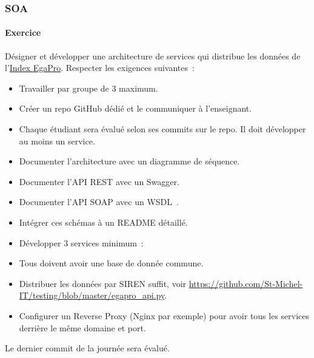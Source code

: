\documentclass{beamer}
\begin{document}
    \begin{frame}
        \transdissolve
        \frametitle{SOA}
        \framesubtitle{Exercice \execcounterdispinc{}}
        \begin{tiny}
            Désigner et développer une architecture de services qui distribue les données de l'\href{https://www.data.gouv.fr/fr/datasets/index-egalite-professionnelle-f-h-des-entreprises-de-50-salaries-ou-plus/}{Index EgaPro}.
            Respecter les exigences suivantes~:
            \begin{itemize}
                \item Travailler par groupe de 3 maximum.
                \item Créer un repo GitHub dédié et le communiquer à l'enseignant.
                \item Chaque étudiant sera évalué selon ses commits sur le repo.
                Il doit développer au moins un service.
                \item Documenter l'architecture avec un diagramme de séquence.
                \item Documenter l'API REST avec un Swagger.
                \item Documenter l'API SOAP avec un WSDL~.
                \item Intégrer ces schémas à un README détaillé.
                \item Développer 3 services minimum~:
                \begin{itemize}
                \end{itemize}
                \item Tous doivent avoir une base de donnée commune.
                \item Distribuer les données par SIREN suffit, voir \url{https://github.com/St-Michel-IT/testing/blob/master/egapro_api.py}.
                \item Configurer un Reverse Proxy (Nginx par exemple) pour avoir tous les services derrière le même domaine et port.
            \end{itemize}
            \begin{dangercolorbox}
                Le dernier commit de la journée sera évalué.
            \end{dangercolorbox}
        \end{tiny}
    \end{frame}
\end{document}
